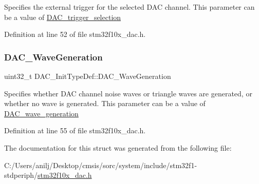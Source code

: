 Specifies the external trigger for the selected D\+AC channel. This parameter can be a value of \hyperlink{group___d_a_c__trigger__selection}{D\+A\+C\+\_\+trigger\+\_\+selection} 

Definition at line 52 of file stm32f10x\+\_\+dac.\+h.

\mbox{\label{struct_d_a_c___init_type_def_a6753e78ddd2dc8273444ba01a272d63a}} 
\subsubsection{\texorpdfstring{D\+A\+C\+\_\+\+Wave\+Generation}{DAC\_WaveGeneration}}
{\footnotesize\ttfamily uint32\+\_\+t D\+A\+C\+\_\+\+Init\+Type\+Def\+::\+D\+A\+C\+\_\+\+Wave\+Generation}

Specifies whether D\+AC channel noise waves or triangle waves are generated, or whether no wave is generated. This parameter can be a value of \hyperlink{group___d_a_c__wave__generation}{D\+A\+C\+\_\+wave\+\_\+generation} 

Definition at line 55 of file stm32f10x\+\_\+dac.\+h.



The documentation for this struct was generated from the following file\+:\begin{DoxyCompactItemize}
\item 
C\+:/\+Users/anilj/\+Desktop/cmsis/sorc/system/include/stm32f1-\/stdperiph/\hyperlink{stm32f10x__dac_8h}{stm32f10x\+\_\+dac.\+h}\end{DoxyCompactItemize}
